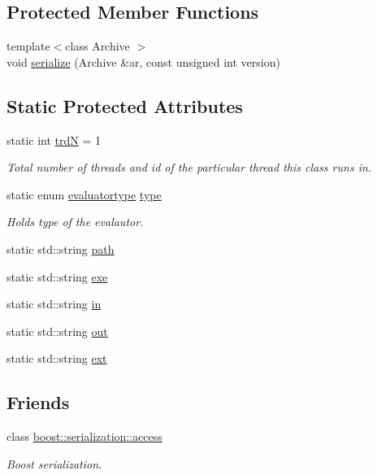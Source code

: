 \subsection*{Protected Member Functions}
\begin{DoxyCompactItemize}
\item 
{\footnotesize template$<$class Archive $>$ }\\void \hyperlink{class_go_s_u_m_1_1_c_evaluator_a4b1d1f83a5a9280b7cbaf65adcc2f7df}{serialize} (Archive \&ar, const unsigned int version)
\end{DoxyCompactItemize}
\subsection*{Static Protected Attributes}
\begin{DoxyCompactItemize}
\item 
static int \hyperlink{class_go_s_u_m_1_1_c_evaluator_ad38d33c6185379f37aab2da03b471f8f}{trd\-N} = 1
\begin{DoxyCompactList}\small\item\em Total number of threads and id of the particular thread this class runs in. \end{DoxyCompactList}\item 
static enum \hyperlink{class_go_s_u_m_1_1_c_evaluator_a50058cbf6a2c5b94677045ee02b67db2}{evaluatortype} \hyperlink{class_go_s_u_m_1_1_c_evaluator_ad6fd7df40c7a7b4ccc9adec41d7442f8}{type}
\begin{DoxyCompactList}\small\item\em Holds type of the evalautor. \end{DoxyCompactList}\item 
static std\-::string \hyperlink{class_go_s_u_m_1_1_c_evaluator_aef57af904e0ce1e60ed12034a369a994}{path}
\item 
static std\-::string \hyperlink{class_go_s_u_m_1_1_c_evaluator_a6e043161a2f3bf2c3065d4db8f84378e}{exe}
\item 
static std\-::string \hyperlink{class_go_s_u_m_1_1_c_evaluator_ae7b62285dd724277532c74a216750539}{in}
\item 
static std\-::string \hyperlink{class_go_s_u_m_1_1_c_evaluator_ad55ba1b2c42a31ecb493a64daf8e9a4e}{out}
\item 
static std\-::string \hyperlink{class_go_s_u_m_1_1_c_evaluator_acacec0607130855ea0840ab2ef7b6418}{ext}
\end{DoxyCompactItemize}
\subsection*{Friends}
\begin{DoxyCompactItemize}
\item 
class \hyperlink{class_go_s_u_m_1_1_c_evaluator_ac98d07dd8f7b70e16ccb9a01abf56b9c}{boost\-::serialization\-::access}
\begin{DoxyCompactList}\small\item\em Boost serialization. \end{DoxyCompactList}\end{DoxyCompactItemize}


